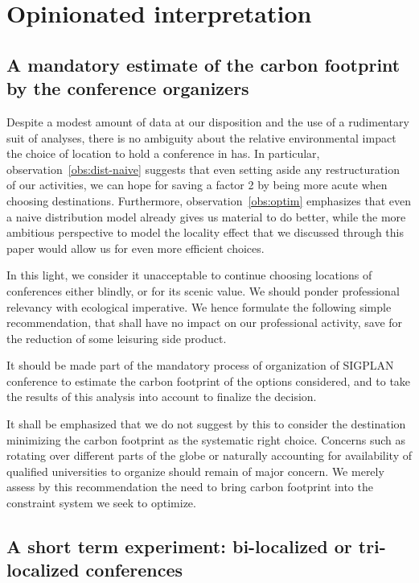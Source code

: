 \section{Opinionated interpretation}
\label{sec:opinions}

\subsection{A mandatory estimate of the carbon footprint by the conference organizers}

Despite a modest amount of data at our disposition and the use of a rudimentary suit of
analyses, there is no ambiguity about the relative environmental impact the choice of
location to hold a conference in has. In particular, observation~\ref{obs:dist-naive}
suggests that even setting aside any restructuration of our activities, we can hope for
saving a factor 2 by being more acute when choosing destinations. Furthermore,
observation~\ref{obs:optim} emphasizes that even a naive distribution model already gives
us material to do better, while the more ambitious perspective to model the locality effect
that we discussed through this paper would allow us for even more efficient choices.

In this light, we consider it unacceptable to continue choosing locations of conferences
either blindly, or for its scenic value. We should ponder professional relevancy with
ecological imperative. We hence formulate the following simple recommendation, that shall
have no impact on our professional activity, save for the reduction of some leisuring side
product.

\begin{recommend}
It should be made part of the mandatory process of organization of SIGPLAN
conference to estimate the carbon footprint of the options considered, and
to take the results of this analysis into account to finalize the decision.
\end{recommend}

It shall be emphasized that we do not suggest by this to consider the destination
minimizing the carbon footprint as the systematic right choice. Concerns such as
rotating over different parts of the globe or naturally accounting for availability
of qualified universities to organize should remain of major concern. We merely
assess by this recommendation the need to bring carbon footprint into the constraint
system we seek to optimize.

\subsection{A short term experiment: bi-localized or tri-localized conferences}

